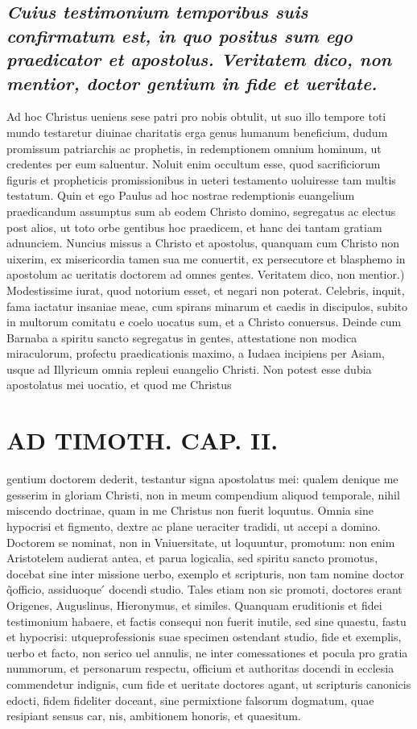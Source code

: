 \documentclass{article}
\begin{document}
\begin{pages}
\subsection*{\textit{Cuius testimonium temporibus suis confirmatum est, in quo positus sum ego praedicator et apostolus. Veritatem dico, non mentior, doctor gentium in fide et ueritate. }}\pstart Ad hoc Christus ueniens sese patri pro nobis obtulit, ut suo illo tempore toti mundo testaretur diuinae charitatis erga genus humanum beneficium, dudum promissum patriarchis ac prophetis, in redemptionem omnium hominum, ut credentes per eum saluentur. Noluit enim occultum esse, quod sacrificiorum figuris et propheticis promissionibus in ueteri testamento uoluiresse tam multis testatum. Quin et ego Paulus ad hoc nostrae redemptionis euangelium praedicandum assumptus sum ab eodem Christo domino, segregatus ac electus post alios, ut toto orbe gentibus hoc praedicem, et hanc dei tantam gratiam adnunciem. Nuncius missus a Christo et apostolus, quanquam cum Christo non uixerim, ex misericordia tamen sua me conuertit, ex persecutore et blasphemo in apostolum ac ueritatis doctorem ad omnes gentes. Veritatem dico, non mentior.) Modestissime iurat, quod notorium esset, et negari non poterat. Celebris, inquit, fama iactatur insaniae meae, cum spirans minarum et caedis in discipulos, subito in multorum comitatu e coelo uocatus sum, et a Christo conuersus. Deinde cum Barnaba a spiritu sancto segregatus in gentes, attestatione non modica miraculorum, profectu praedicationis maximo, a Iudaea incipiens per Asiam, usque  ad Illyricum omnia repleui euangelio Christi. Non potest esse dubia apostolatus mei uocatio, et quod me Christus  \pend
\section*{AD TIMOTH. CAP. II. }
\marginpar{[ p.485 ]}\pstart gentium doctorem dederit, testantur signa apostolatus mei: qualem denique  me gesserim in gloriam Christi, non in meum compendium aliquod temporale, nihil miscendo doctrinae, quam in me Christus non fuerit loquutus. Omnia sine hypocrisi et figmento, dextre ac plane ueraciter tradidi, ut accepi a domino. Doctorem se nominat, non in Vniuersitate, ut loquuntur, promotum: non enim Aristotelem audierat antea, et parua logicalia, sed spiritu sancto promotus, docebat sine inter missione uerbo, exemplo et scripturis, non tam nomine doctor q̃officio, assiduoque ́ docendi studio. Tales etiam non sic promoti, doctores erant Origenes, Auguslinus, Hieronymus, et similes. Quanquam eruditionis et fidei testimonium habaere, et factis consequi non fuerit inutile, sed sine quaestu, fastu et hypocrisi: utqueprofessionis suae specimen ostendant studio, fide et exemplis, uerbo et facto, non serico uel annulis, ne inter comessationes et pocula pro gratia nummorum, et personarum respectu, officium et authoritas docendi in ecclesia commendetur indignis, cum fide et ueritate doctores agant, ut scripturis canonicis edocti, fidem fideliter doceant, sine permixtione falsorum dogmatum, quae resipiant sensus car, nis, ambitionem honoris, et quaesitum.  \pend
{}
{}

\end{pages}
\end{document}
